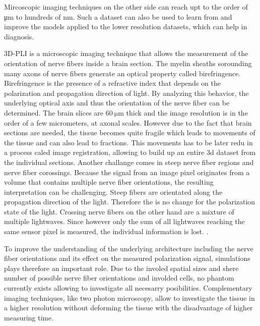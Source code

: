 Mircoscopic imaging techniques on the other side can reach upt to the order of \si{\micro\meter} to hundreds of \si{\nano\meter}.
Such a dataset can also be used to learn from and improve the models applied to the lower resolution datasets, which can help in diagnosis. \cite{MaierHein2017, Schilling2021, Yendiki2021, Costantini2021}
\par
% 
\ac{3D-PLI} is a microscopic imaging technique that allows the measurement of the orientation of nerve fibers inside a brain section.
The myelin sheaths sorounding many axons of nerve fibers generate an optical property called birefringence.
Birefringence is the presence of a refractive index that depends on the polarization and propagation direction of light.
By analyzing this behavior, the underlying optical axis and thus the orientation of the nerve fiber can be determined.
The brain slices are $\SI{60}{\micro\meter}$ thick and the image resolution is in the order of a few micrometers, \ie{} at axonal scales.
However due to the fact that brain sections are needed, the tissue becomes quite fragile which leads to movements of the tissue and can also lead to fractions.
This movements has to be later redu in a process caled image registration, allowing to build up an entire 3d dataset from the individual sections.
Another challange comes in steep nerve fiber regions and nerve fiber corossings.
Because the signal from an image pixel originates from a volume that contains multiple nerve fiber orientations, the resulting interpretation can be challenging.
Steep fibers are \eg{} orientated along the propagation direction of the light.
Therefore the is no change for the polarization state of the light.
Crossing nerve fibers on the other hand are a mixture of multiple lightwaves.
Since however only the sum of all lightwaves reaching the same sensor pixel is measured, the individual information is lost.
. \cite{Axer2011a, Axer2011, Axer2016}
\par
% 
To improve the understanding of the underlying architecture including the nerve fiber orientations and its effect on the measured polarization signal, simulations plays therefore an important role.
Due to the involed spatial sizes and shere number of possible nerve fiber orientations and involded cells, no phantom currently exists allowing to investigate all necesarry posibilities.
Complementary imaging techniques, like two photon microscopy, allow to investigate the tissue in a higher resolution without deforming the tissue with the disadvantage of higher measuring time.
\par

